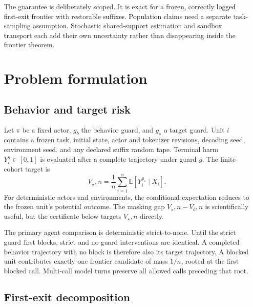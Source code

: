 \documentclass{article}
\newcommand{\E}{\mathbb{E}}
\newcommand{\Vstar}{V_\star}
\newcommand{\Vbeh}{V_b}
\begin{document}
The guarantee is deliberately scoped. It is exact for a frozen, correctly logged first-exit
frontier with restorable suffixes. Population claims need a separate task-sampling assumption.
Stochastic shared-support estimation and sandbox transport each add their own uncertainty rather
than disappearing inside the frontier theorem.

\section{Problem formulation}
\label{sec:problem}

\subsection{Behavior and target risk}

Let $\pi$ be a fixed actor, $g_b$ the behavior guard, and $g_\star$ a target guard. Unit $i$
contains a frozen task, initial state, actor and tokenizer revisions, decoding seed, environment
seed, and any declared suffix random tape. Terminal harm $Y_i^{g}\in[0,1]$ is evaluated after a
complete trajectory under guard $g$. The finite-cohort target is
\begin{equation}
  \Vstar,n = \frac{1}{n}\sum_{i=1}^{n}
  \E\!\left[Y_i^{g_\star}\mid X_i\right].
  \label{eq:finite-estimand}
\end{equation}
For deterministic actors and environments, the conditional expectation reduces to the frozen
unit's potential outcome. The masking gap $\Vstar,n-\Vbeh,n$ is scientifically useful, but the
certificate below targets $\Vstar,n$ directly.

The primary agent comparison is deterministic strict-to-none. Until the strict guard first
blocks, strict and no-guard interventions are identical. A completed behavior trajectory with no
block is therefore also its target trajectory. A blocked unit contributes exactly one frontier
candidate of mass $1/n$, rooted at the first blocked call. Multi-call model turns preserve all
allowed calls preceding that root.

\subsection{First-exit decomposition}
\end{document}
